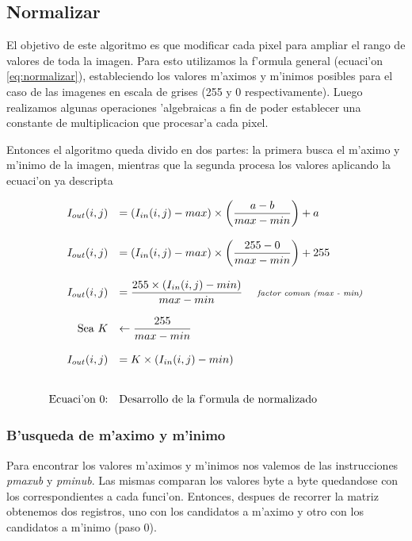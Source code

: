 \subsection{Normalizar}
El objetivo de este algoritmo es que modificar cada pixel para ampliar el rango de valores de toda la imagen. Para esto utilizamos la f'ormula general (ecuaci'on \ref{eq:normalizar}), estableciendo los valores m'aximos y m'inimos posibles para el caso de las imagenes en escala de grises (255 y 0 respectivamente). Luego realizamos algunas operaciones 'algebraicas a fin de poder establecer una constante de multiplicacion que procesar'a cada pixel.

Entonces el algoritmo queda divido en dos partes: la primera busca el m'aximo y m'inimo de la imagen, mientras que la segunda procesa los valores aplicando la ecuaci'on ya descripta

\begin{equation}
\begin{array}{rl}
I_{out}(i,j) &= (I_{in}(i,j) - max) \times \left( \dfrac{a-b}{max-min} \right) + a  \\
\\
I_{out}(i,j) &= (I_{in}(i,j) - max) \times \left( \dfrac{255-0}{max-min} \right) + 255  \\
\\
I_{out}(i,j) &= \dfrac{255 \times (I_{in}(i,j) - min)}{max-min}  $\hspace{10pt} \textit{\scriptsize factor comun (max - min)}$ \\
\\
$Sea $ K &\leftarrow \dfrac{255}{max-min}  \\
\\
I_{out}(i,j) &= K \times (I_{in}(i,j) - min) \\
\\ \\
$Ecuaci'on \theequation:$&$Desarrollo de la f'ormula de normalizado$
\end{array} 
\label{eq:normalizar}
\end{equation}


\subsubsection*{B'usqueda de m'aximo y m'inimo}

Para encontrar los valores m'aximos y m'inimos nos valemos de las instrucciones \textit{pmaxub} y \textit{pminub}. Las mismas comparan los valores byte a byte quedandose con los correspondientes a cada funci'on. Entonces, despues de recorrer la matriz obtenemos dos registros, uno con los candidatos a m'aximo y otro con los candidatos a m'inimo (paso 0). 

